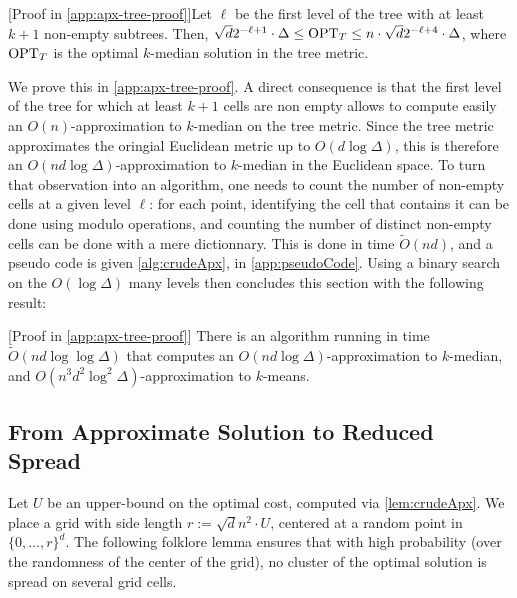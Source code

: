 \begin{lemma}\label{lem:apxTree}
[Proof in \cref{app:apx-tree-proof}]Let $\ell$ be the first level of the tree with at least $k+1$ non-empty subtrees. Then, $\sqrt{d}2^{-\ell+1} \cdot \Delta \leq
\text{OPT}_T \leq n \cdot \sqrt{d}2^{-\ell+4} \cdot \Delta$, where $\text{OPT}_T$ is the optimal $k$-median solution in the tree metric.
\end{lemma}

We prove this in \cref{app:apx-tree-proof}. A direct consequence  is that the first level of the tree for which at least
$k+1$ cells are non empty allows to compute easily an $O(n)$-approximation to $k$-median on the tree metric. Since the tree metric approximates the oringial Euclidean metric up to $O(d \log \Delta)$, this is therefore an $O(n d \log \Delta)$-approximation to $k$-median in the Euclidean space.
 To turn that observation into an algorithm, one needs to count the number of non-empty cells at a given level $\ell$: for each point, identifying the cell that contains it can be done using modulo operations, and counting the number of distinct non-empty cells can be done with a mere dictionnary.
This is done in time $\tilde O(nd)$, and a pseudo code is given \cref{alg:crudeApx}, in \cref{app:pseudoCode}.  Using a binary search on the $O(\log \Delta)$ many levels then concludes this section with the following result:

\begin{lemma}\label{lem:crudeApx}[Proof in \cref{app:apx-tree-proof}]
There is an algorithm running in time $\tilde O(nd \log \log \Delta)$ that computes an $O(n d \log \Delta)$-approximation to $k$-median, and $O(n^3 d^2 \log^2 \Delta)$-approximation to $k$-means.
\end{lemma}



\subsection{From Approximate Solution to Reduced Spread}


Let $U$ be an upper-bound on the optimal cost, computed via \cref{lem:crudeApx}. We place a grid with side length $r:= \sqrt{d} n^2\cdot U$, centered at a random point in $\{0, ..., r\}^d$.
The following folklore lemma ensures that with high probability (over the randomness of the center of the grid), no cluster of the optimal solution is spread on several grid cells.

